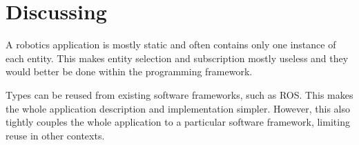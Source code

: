 \section{Discussing}
\label{sec:discussing}

A robotics application is mostly static and often contains only one
instance of each entity. This makes entity selection and subscription
mostly useless and they would better be done within the programming
framework.

Types can be reused from existing software frameworks, such as ROS.
This makes the whole application description and implementation
simpler. However, this also tightly couples the whole application to a
particular software framework, limiting reuse in other contexts.

